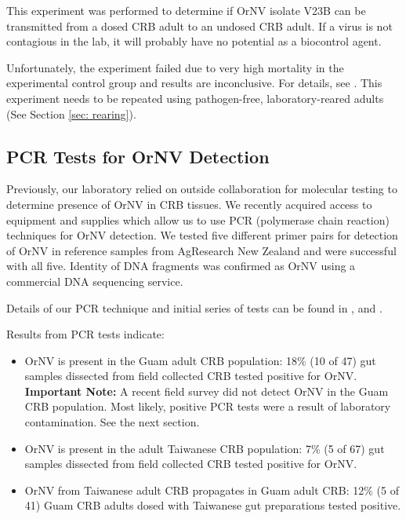 \documentclass[12pt,letterpaper,english,bibliography=totocnumbered,abstract=on]{scrartcl}
\begin{document}
This experiment was performed to determine if OrNV isolate V23B can be transmitted from a dosed CRB adult to an undosed CRB adult. If a virus is not contagious in the lab, it will probably have no potential as a biocontrol agent. 

Unfortunately, the experiment failed due to very high mortality in the experimental control group and results are inconclusive. For details, see \cite{grasela_guam_2020}. This experiment needs to be repeated using pathogen-free, laboratory-reared adults (See Section \ref{sec: rearing}).

\subsection{PCR Tests for OrNV Detection}
\label{sec: pcr}

Previously, our laboratory relied on outside collaboration for molecular testing to determine presence of OrNV in CRB tissues. We recently acquired access to equipment and supplies which allow us to use PCR (polymerase chain reaction) techniques for OrNV detection. We tested five different primer pairs for detection of OrNV in reference samples from AgResearch New Zealand and were successful with all five. Identity of DNA fragments was confirmed as OrNV using a commercial DNA sequencing service.

Details of our PCR technique and initial series of tests can be found in \cite{grasela_technical_2020}, 
\cite{grasela_technical_2020-1} and \cite{grasela_technical_2020-2}.

Results from PCR tests indicate:
\label{(subsec: pcr results)}

\begin{itemize}

\item OrNV is present in the Guam adult CRB population: 18\% (10 of 47) gut samples dissected from field collected CRB tested positive for OrNV. \textbf{Important Note:} A recent field survey did not detect OrNV in the Guam CRB population. Most likely, positive PCR tests were a result of laboratory contamination. See the next section.

\item  OrNV is present in the adult Taiwanese CRB population:  7\% (5 of 67) gut samples dissected from field collected CRB tested positive for OrNV. 

\item  OrNV from Taiwanese adult CRB propagates in Guam adult CRB: 12\% (5 of 41) Guam CRB adults dosed with Taiwanese gut preparations tested positive.   

\end{itemize}
\end{document}
